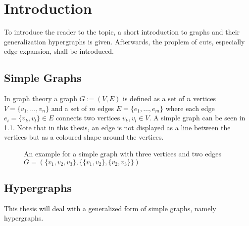 
\chapter{Introduction}\label{chapter:introduction}

To introduce the reader to the topic, a short introduction to graphs and their generalization hypergraphs is given. Afterwards, the proplem of cuts, especially edge expansion, shall be introduced.
\section{Simple Graphs} %
In graph theory a graph $G := (V,E)$ is defined as a set of $n$ vertices $V = \{v_1, \ldots, v_n \}$ and a set of $ m $ edges $E = \{e_1, \ldots, e_m\}$ where each edge $e_i = \{v_k, v_l\} \in E$ connects two vertices $v_k, v_l \in V$. A simple graph can be seen in \cref{fig:exapmlegraph}. Note that in this thesis, an edge is not displayed as a line between the vertices but as a coloured shape around the vertices.



\begin{figure} [htpb]
	\centering
	\caption[Example graph]{An example for a simple graph with three vertices and two edges $G=(\{v_1, v_2, v_3\},\{\{v_1, v_2\}, \{v_2,v_3\}\} )$}\label{fig:exapmlegraph}
\end{figure}

\section{Hypergraphs}
This thesis will deal with a generalized form of simple graphs, namely hypergraphs.

